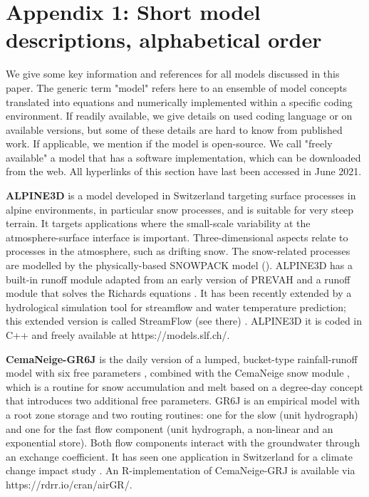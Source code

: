 \documentclass[10pt,a4paper]{article}
\begin{document}
\section*{Appendix 1: Short model descriptions, alphabetical order}
\label{appendix:1}

We give some key information and references for all models discussed in this paper. The generic term "model" refers here to an ensemble of model concepts translated into equations and numerically implemented within a specific coding environment. If readily available, we give details on used coding language or on available versions, but some of these details are hard to know from published work. If applicable, we mention if the model is open-source. We call "freely available" a model that has a  software implementation, which can be downloaded from the web. All hyperlinks of this section have last been accessed in June 2021.

\textbf{ALPINE3D} \citep{Lehning2006} is a model developed in Switzerland targeting surface processes in alpine environments, in particular snow processes, and is suitable for very steep terrain. It targets applications where the small-scale variability at the atmosphere-surface interface is important. Three-dimensional aspects relate to processes in the atmosphere, such as drifting snow. The snow-related processes are modelled by the physically-based SNOWPACK model (\citealt{Bartelt2002, Lehning2002a, Lehning2002b}). ALPINE3D has a built-in runoff module adapted from an early version of PREVAH \citep{Lehning2006} and a runoff module that solves the Richards equations \citep{Wever2017}. It has been recently extended by a hydrological simulation tool for streamflow and water temperature prediction; this extended version is called StreamFlow (see there) \citep{Gallice2016}. ALPINE3D it is coded in C++ and freely available at https://models.slf.ch/.  

\textbf{CemaNeige-GR6J} is the daily version of a lumped, bucket-type rainfall-runoff model with six free parameters \citep{Pushpalatha2011}, combined with the CemaNeige snow module \citep{Valery2014a, Valery2014b}, which is a routine for snow accumulation and melt based on a degree-day concept that introduces two additional free parameters. GR6J is an empirical model with a root zone storage and two routing routines: one for the slow (unit hydrograph) and one for the fast flow component ({unit hydrograph}, a non-linear and an exponential store). Both flow components interact with the groundwater through an exchange coefficient. It has seen one application in Switzerland for a climate change impact study \citep{Keller2019a}. An R-implementation of CemaNeige-GRJ is available via https://rdrr.io/cran/airGR/.
\end{document}
